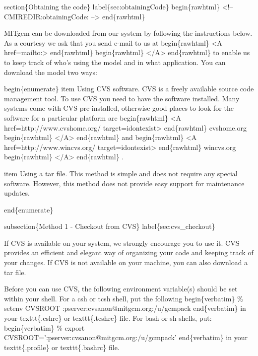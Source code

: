 \documentclass[letterpaper,10pt,english]{sphinxmanual}
\begin{document}
section\{Obtaining the code\}
label\{sec:obtainingCode\}
begin\{rawhtml\}
\textless{}!-- CMIREDIR:obtainingCode: --\textgreater{}
end\{rawhtml\}

MITgcm can be downloaded from our system by following
the instructions below. As a courtesy we ask that you send e-mail to us at
begin\{rawhtml\} \textless{}A href=mailto:\textgreater{} end\{rawhtml\}
begin\{rawhtml\} \textless{}/A\textgreater{} end\{rawhtml\}
to enable us to keep track of who's using the model and in what application.
You can download the model two ways:

begin\{enumerate\}
item Using CVS software. CVS is a freely available source code management
tool. To use CVS you need to have the software installed. Many systems
come with CVS pre-installed, otherwise good places to look for
the software for a particular platform are
begin\{rawhtml\} \textless{}A href=http://www.cvshome.org/ target=\sphinxquotedblright{}idontexist\sphinxquotedblright{}\textgreater{} end\{rawhtml\}
cvshome.org
begin\{rawhtml\} \textless{}/A\textgreater{} end\{rawhtml\}
and
begin\{rawhtml\} \textless{}A href=http://www.wincvs.org/ target=\sphinxquotedblright{}idontexist\sphinxquotedblright{}\textgreater{} end\{rawhtml\}
wincvs.org
begin\{rawhtml\} \textless{}/A\textgreater{} end\{rawhtml\}
.

item Using a tar file. This method is simple and does not
require any special software. However, this method does not
provide easy support for maintenance updates.

end\{enumerate\}

subsection\{Method 1 - Checkout from CVS\}
label\{sec:cvs\_checkout\}

If CVS is available on your system, we strongly encourage you to use it. CVS
provides an efficient and elegant way of organizing your code and keeping
track of your changes. If CVS is not available on your machine, you can also
download a tar file.

Before you can use CVS, the following environment variable(s) should
be set within your shell.  For a csh or tcsh shell, put the following
begin\{verbatim\}
\% setenv CVSROOT :pserver:cvsanon@mitgcm.org:/u/gcmpack
end\{verbatim\}
in your texttt\{.cshrc\} or texttt\{.tcshrc\} file.  For bash or sh
shells, put:
begin\{verbatim\}
\% export CVSROOT=':pserver:cvsanon@mitgcm.org:/u/gcmpack'
end\{verbatim\}
in your texttt\{.profile\} or texttt\{.bashrc\} file.
\end{document}
